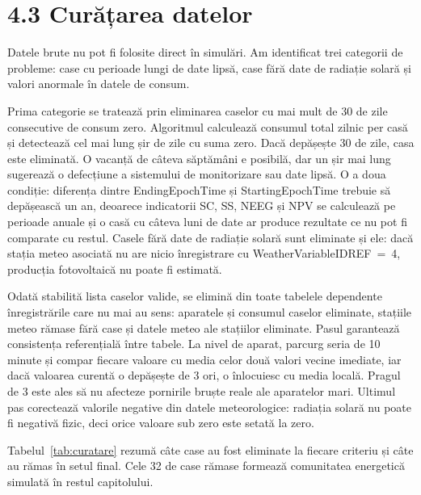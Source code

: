 \documentclass[12pt,a4paper]{report}
\begin{document}
\section*{4.3 Curățarea datelor}

Datele brute nu pot fi folosite direct în simulări. Am identificat trei categorii de probleme: case cu perioade lungi de date lipsă, case fără date de radiație solară și valori anormale în datele de consum.

Prima categorie se tratează prin eliminarea caselor cu mai mult de 30 de zile consecutive de consum zero. Algoritmul calculează consumul total zilnic per casă și detectează cel mai lung șir de zile cu suma zero. Dacă depășește 30 de zile, casa este eliminată. O vacanță de câteva săptămâni e posibilă, dar un șir mai lung sugerează o defecțiune a sistemului de monitorizare sau date lipsă. O a doua condiție: diferența dintre EndingEpochTime și StartingEpochTime trebuie să depășească un an, deoarece indicatorii SC, SS, NEEG și NPV se calculează pe perioade anuale și o casă cu câteva luni de date ar produce rezultate ce nu pot fi comparate cu restul. Casele fără date de radiație solară sunt eliminate și ele: dacă stația meteo asociată nu are nicio înregistrare cu WeatherVariableIDREF~=~4, producția fotovoltaică nu poate fi estimată.

Odată stabilită lista caselor valide, se elimină din toate tabelele dependente înregistrările care nu mai au sens: aparatele și consumul caselor eliminate, stațiile meteo rămase fără case și datele meteo ale stațiilor eliminate. Pasul garantează consistența referențială între tabele. La nivel de aparat, parcurg seria de 10 minute și compar fiecare valoare cu media celor două valori vecine imediate, iar dacă valoarea curentă o depășește de 3 ori, o înlocuiesc cu media locală. Pragul de 3 este ales să nu afecteze pornirile bruște reale ale aparatelor mari. Ultimul pas corectează valorile negative din datele meteorologice: radiația solară nu poate fi negativă fizic, deci orice valoare sub zero este setată la zero.

Tabelul~\ref{tab:curatare} rezumă câte case au fost eliminate la fiecare criteriu și câte au rămas în setul final. Cele 32 de case rămase formează comunitatea energetică simulată în restul capitolului.
\end{document}
